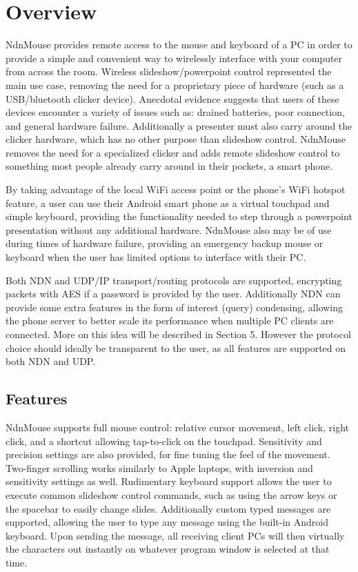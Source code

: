 \documentclass{sig-alternate}
\renewcommand\_{\textunderscore\allowbreak}  %
\begin{document}
\section{Overview}
NdnMouse provides remote access to the mouse and keyboard of a PC in order to provide a simple and convenient way to wirelessly interface with your computer from across the room. Wireless slideshow/powerpoint control represented the main use case, removing the need for a proprietary piece of hardware (such as a USB/bluetooth clicker device). Anecdotal evidence suggests that users of these devices encounter a variety of issues such as: drained batteries, poor connection, and general hardware failure. Additionally a presenter must also carry around the clicker hardware, which has no other purpose than slideshow control. NdnMouse removes the need for a specialized clicker and adds remote slideshow control to something most people already carry around in their pockets, a smart phone. 

By taking advantage of the local WiFi access point or the phone's WiFi hotspot feature, a user can use their Android smart phone as a virtual touchpad and simple keyboard, providing the functionality needed to step through a powerpoint presentation without any additional hardware. NdnMouse also may be of use during times of hardware failure, providing an emergency backup mouse or keyboard when the user has limited options to interface with their PC.

Both NDN and UDP/IP transport/routing protocols are supported, encrypting packets with AES if a password is provided by the user. Additionally NDN can provide some extra features in the form of interest (query) condensing, allowing the phone server to better scale its performance when multiple PC clients are connected. More on this idea will be described in Section 5. However the protocol choice should ideally be transparent to the user, as all features are supported on both NDN and UDP.

\subsection{Features}
NdnMouse supports full mouse control: relative cursor movement, left click, right click, and a shortcut allowing tap-to-click on the touchpad. Sensitivity and precision settings are also provided, for fine tuning the feel of the movement. Two-finger scrolling works similarly to Apple laptops, with inversion and sensitivity settings as well. Rudimentary keyboard support allows the user to execute common slideshow control commands, such as using the arrow keys or the spacebar to easily change slides. Additionally custom typed messages are supported, allowing the user to type any message using the built-in Android keyboard. Upon sending the message, all receiving client PCs will then virtually the characters out instantly on whatever program window is selected at that time.
\end{document}
